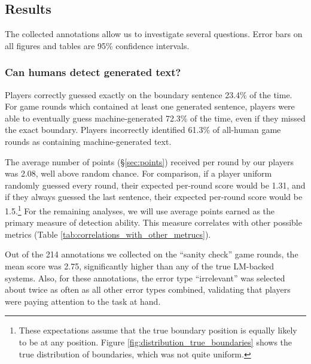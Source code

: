 \subsection{Results}
\label{section:roft_results}
The collected annotations allow us to investigate several questions.
Error bars on all figures and tables are 95\% confidence intervals.

\subsubsection{Can humans detect generated text?}
Players correctly guessed exactly on the boundary sentence 23.4\% of the time.
For game rounds which contained at least one generated sentence, players were able to eventually guess machine-generated 72.3\% of the time, even if they missed the exact boundary. %
Players incorrectly identified 61.3\% of all-human game rounds as containing machine-generated text.

The average number of points (\S\ref{sec:points}) received per round by our players was 2.08, well above random chance.
For comparison, if a player uniform randomly guessed every round, their expected per-round score would be 1.31, and
if they always guessed the last sentence, their expected per-round score would be 1.5.\footnote{These expectations assume that the true boundary position is equally likely to be at any position. Figure \ref{fig:distribution_true_boundaries} shows the true distribution of boundaries, which was not quite uniform.}
For the remaining analyses, we will use average points earned as the primary measure of detection ability.
This measure correlates with other possible metrics (Table \ref{tab:correlations_with_other_metrucs}).

Out of the 214 annotations we collected on the ``sanity check'' game rounds, the mean score was 2.75, significantly higher than any of the true LM-backed systems.
Also, for these annotations, the error type ``irrelevant'' was selected about twice as often as all other error types combined, validating that players were paying attention to the task at hand.

